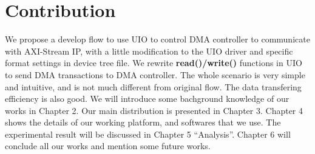 



\section{Contribution}
\label{sec:contribution}
We propose a develop flow to use UIO to control DMA controller to communicate with AXI-Stream IP, with a little modification to the UIO driver and specific format settings in device tree file. We rewrite \textbf{read()/write()} functions in UIO to send DMA transactions to DMA controller. The whole scenario is very simple and intuitive, and is not much different from original flow. The data transfering efficiency is also good. We will introduce some bachground knowledge of our works in Chapter 2. Our main distribution is presented in Chapter 3. Chapter 4 shows the details of our working platform, and softwares that we use.  
The experimental result will be discussed in Chapter 5 ``Analysis''. Chapter 6 will conclude all our works and mention some future works.

